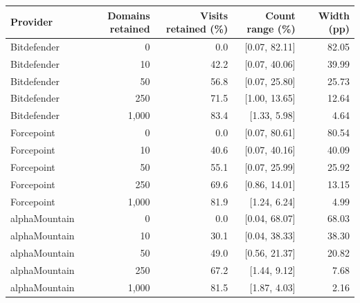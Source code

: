 \begin{tabular}{lrrrr}
\toprule
Provider & Domains retained & Visits retained (\%) & Count range (\%) & Width (pp) \\
\midrule
Bitdefender & 0 & 0.0 & [0.07, 82.11] & 82.05 \\
Bitdefender & 10 & 42.2 & [0.07, 40.06] & 39.99 \\
Bitdefender & 50 & 56.8 & [0.07, 25.80] & 25.73 \\
Bitdefender & 250 & 71.5 & [1.00, 13.65] & 12.64 \\
Bitdefender & 1,000 & 83.4 & [1.33, 5.98] & 4.64 \\
Forcepoint & 0 & 0.0 & [0.07, 80.61] & 80.54 \\
Forcepoint & 10 & 40.6 & [0.07, 40.16] & 40.09 \\
Forcepoint & 50 & 55.1 & [0.07, 25.99] & 25.92 \\
Forcepoint & 250 & 69.6 & [0.86, 14.01] & 13.15 \\
Forcepoint & 1,000 & 81.9 & [1.24, 6.24] & 4.99 \\
alphaMountain & 0 & 0.0 & [0.04, 68.07] & 68.03 \\
alphaMountain & 10 & 30.1 & [0.04, 38.33] & 38.30 \\
alphaMountain & 50 & 49.0 & [0.56, 21.37] & 20.82 \\
alphaMountain & 250 & 67.2 & [1.44, 9.12] & 7.68 \\
alphaMountain & 1,000 & 81.5 & [1.87, 4.03] & 2.16 \\
\bottomrule
\end{tabular}
